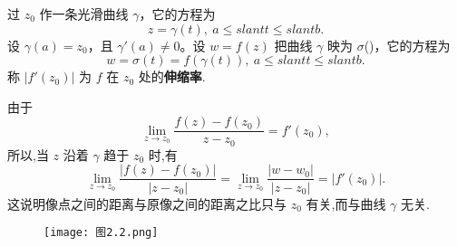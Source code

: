 \documentclass[../../main.tex]{subfiles}
\begin{document}
\begin{definition}[伸缩率]
过 \( z_0 \) 作一条光滑曲线 \( \gamma \)，它的方程为  
\[ z = \gamma(t),\ a \leqslant slant t \leqslant slant b. \]  
设 \( \gamma(a) = z_0 \)，且 \( \gamma'(a) \neq 0 \)。设 \( w = f(z) \) 把曲线 \( \gamma \) 映为 \( \sigma \)()，它的方程为  
\[ w = \sigma(t) = f(\gamma(t)),\ a \leqslant slant t \leqslant slant b. \] 
称 \( |f'(z_0)| \) 为 \( f \) 在 \( z_0 \) 处的\textbf{伸缩率}.
\end{definition}
\begin{note}
由于
\[
\lim_{z \to z_0} \frac{f(z) - f(z_0)}{z - z_0} = f'(z_0),
\]
所以,当 \( z \) 沿着 \( \gamma \) 趋于 \( z_0 \) 时,有
\[
\lim_{z \to z_0} \frac{|f(z) - f(z_0)|}{|z - z_0|} = \lim_{z \to z_0} \frac{|w - w_0|}{|z - z_0|} = |f'(z_0)|.
\]
这说明像点之间的距离与原像之间的距离之比只与 \( z_0 \) 有关,而与曲线 \( \gamma \) 无关. 
\end{note}

\begin{figure}[H]
\centering
\texttt{[image: 
图2.2.png]}
\caption{}
\label{figure:image-图2.2}
\end{figure}
\end{document}
